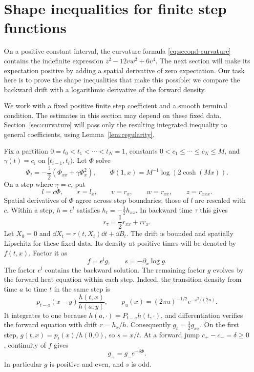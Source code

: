 \section{Shape inequalities for finite step functions}
\label{shape:section}

On a positive constant interval, the curvature formula
\eqref{eq:second-curvature} contains the indefinite expression
$z^2-12vw^2+6v^4$.  The next section will make its expectation positive
by adding a spatial derivative of zero expectation.  Our task here is to
prove the shape inequalities that make this possible: we compare the
backward drift with a logarithmic derivative of the forward density.

We work with a fixed positive finite step coefficient and a smooth
terminal condition.  The estimates in this section may depend on these
fixed data.  Section~\ref{sec:curvature} will pass only the resulting
integrated inequality to general coefficients, using
Lemma~\ref{lem:regularity}.

Fix a partition $0=t_0<t_1<\cdots<t_N=1$, constants
$0<c_1\le\cdots\le c_N\le M$, and
$\gamma(t)=c_i$ on $[t_{i-1},t_i)$.  Let $\Phi$ solve
\[
 \Phi_t=-\frac12(\Phi_{xx}+\gamma\Phi_x^2),
 \qquad \Phi(1,x)=M^{-1}\log(2\cosh(Mx)).
\]
On a step where $\gamma=c$, put
\[
 l=c\Phi,\qquad r=l_x,\qquad v=r_x,
 \qquad w=r_{xx},\qquad z=r_{xxx}.
\]
Spatial derivatives of $\Phi$ agree across step boundaries; those of $l$
are rescaled with $c$.  Within a step, $h=e^l$ satisfies
$h_t=-\tfrac12h_{xx}$.  In backward time $\tau$ this gives
\begin{equation}\label{shape:backward-r}
 r_\tau=\frac12r_{xx}+rr_x.
\end{equation}
Let $X_0=0$ and $\dd X_t=r(t,X_t)\dd t+\dd B_t$.  The drift is bounded
and spatially Lipschitz for these fixed data.  Its density at positive times
will be denoted by $f(t,x)$.  Factor it as
\[
 f=e^l g,\qquad s=-\partial_x\log g.
\]
The factor $e^l$ contains the backward solution.  The remaining factor
$g$ evolves by the forward heat equation within each step.  Indeed, the
transition density from time $a$ to time $t$ in the same step is
\[
 p_{t-a}(x-y)\frac{h(t,x)}{h(a,y)},\qquad
 p_u(x)=(2\pi u)^{-1/2}e^{-x^2/(2u)}.
\]
It integrates to one because $h(a,\cdot)=P_{t-a}h(t,\cdot)$, and
differentiation verifies the forward equation with drift $r=h_x/h$.
Consequently $g_t=\tfrac12g_{xx}$.  On the first step,
$g(t,x)=p_t(x)/h(0,0)$, so $s=x/t$.  At a forward jump
$c_+-c_-=\delta\ge0$, continuity of $f$ gives
\begin{equation}\label{tail:g-jump}
 g_+=g_-e^{-\delta\Phi}.
\end{equation}
In particular $g$ is positive and even, and $s$ is odd.

